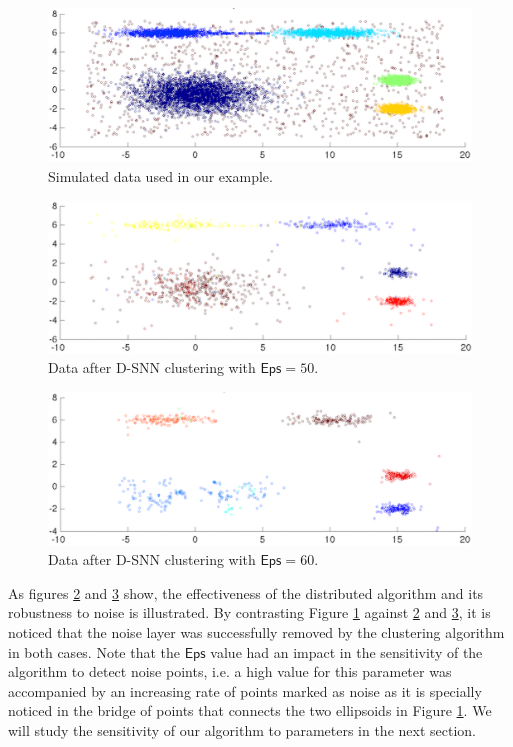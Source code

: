 \documentclass[preprint,12pt,authoryear,review]{elsarticle}
\begin{document}
\begin{figure}[!htbp]
\centering
  \includegraphics[scale=0.47]{toy_example_original.pdf}
  \caption{Simulated data used in our example.}
  \label{fig:toy_original}
\end{figure}

\begin{figure}[!htbp]
\centering
  \includegraphics[scale=0.54]{toy_example_after_Dsnn_2.pdf}
  \caption{Data after D-SNN clustering with $\mathsf{Eps}=50$.}
  \label{fig:toy_dsnn1}
\end{figure}

\begin{figure}[!htbp]
\centering
  \includegraphics[scale=0.54]{toy_example_after_Dsnn_1.pdf}
  \caption{Data after D-SNN clustering with $\mathsf{Eps}=60$.}
  \label{fig:toy_dsnn2}
\end{figure}

As figures \ref{fig:toy_dsnn1} and \ref{fig:toy_dsnn2} show, the effectiveness of the distributed algorithm and its robustness to noise is illustrated. 
By contrasting Figure \ref{fig:toy_original} against \ref{fig:toy_dsnn1} and \ref{fig:toy_dsnn2}, it is noticed that the noise layer was successfully removed by the clustering algorithm in both cases. Note that the $\mathsf{Eps}$ value had an impact in the sensitivity of the algorithm to detect noise points, i.e. a high value for this parameter was accompanied by an increasing rate of points marked as noise as it is specially noticed in the bridge of points that connects the two ellipsoids in Figure \ref{fig:toy_original}. We will study the sensitivity of our algorithm to parameters in the next section. 
\end{document}
